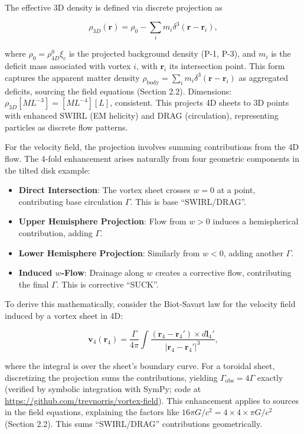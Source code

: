 The effective 3D density is defined via discrete projection as

\begin{equation}
\rho_{3D}(\mathbf{r}) = \rho_0 - \sum_i m_i \delta^3(\mathbf{r} - \mathbf{r}_i),
\end{equation}

where $\rho_0 = \rho_{4D}^0 \xi_c$ is the projected background density (P-1, P-3), and $m_i$ is the deficit mass associated with vortex $i$, with $\mathbf{r}_i$ its intersection point. This form captures the apparent matter density $\rho_{\text{body}} = \sum_i m_i \delta^3(\mathbf{r} - \mathbf{r}_i)$ as aggregated deficits, sourcing the field equations (Section 2.2). Dimensions: $\rho_{3D} [M L^{-3}] = [M L^{-4}] [L]$, consistent. This projects 4D sheets to 3D points with enhanced SWIRL (EM helicity) and DRAG (circulation), representing particles as discrete flow patterns.

For the velocity field, the projection involves summing contributions from the 4D flow. The 4-fold enhancement arises naturally from four geometric components in the tilted disk example:

\begin{itemize}
\item \textbf{Direct Intersection}: The vortex sheet crosses $w=0$ at a point, contributing base circulation $\Gamma$. This is base ``SWIRL/DRAG''.
\item \textbf{Upper Hemisphere Projection}: Flow from $w>0$ induces a hemispherical contribution, adding $\Gamma$.
\item \textbf{Lower Hemisphere Projection}: Similarly from $w<0$, adding another $\Gamma$.
\item \textbf{Induced $w$-Flow}: Drainage along $w$ creates a corrective flow, contributing the final $\Gamma$. This is corrective ``SUCK''.
\end{itemize}

To derive this mathematically, consider the Biot-Savart law for the velocity field induced by a vortex sheet in 4D:

\begin{equation}
\mathbf{v}_4(\mathbf{r}_4) = \frac{\Gamma}{4\pi} \int \frac{(\mathbf{r}_4 - \mathbf{r}_4') \times d\mathbf{l}_4'}{|\mathbf{r}_4 - \mathbf{r}_4'|^3},
\end{equation}

where the integral is over the sheet's boundary curve. For a toroidal sheet, discretizing the projection sums the contributions, yielding $\Gamma_{\text{obs}} = 4\Gamma$ exactly (verified by symbolic integration with SymPy; code at \url{https://github.com/trevnorris/vortex-field}). This enhancement applies to sources in the field equations, explaining the factors like $16\pi G/c^2 = 4 \times 4 \times \pi G/c^2$ (Section 2.2). This sums ``SWIRL/DRAG'' contributions geometrically.

